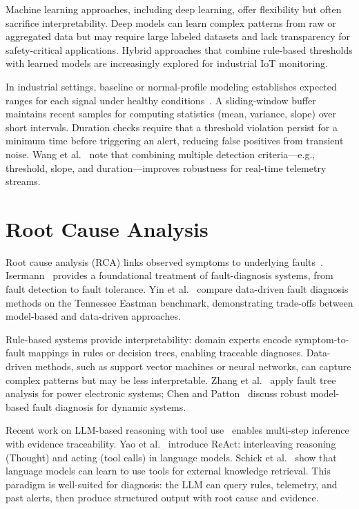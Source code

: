 \documentclass[12pt,letterpaper]{report}
\begin{document}
Machine learning approaches, including deep learning, offer flexibility but often sacrifice interpretability. Deep models can learn complex patterns from raw or aggregated data but may require large labeled datasets and lack transparency for safety-critical applications. Hybrid approaches that combine rule-based thresholds with learned models are increasingly explored for industrial IoT monitoring.

In industrial settings, baseline or normal-profile modeling establishes expected ranges for each signal under healthy conditions~\cite{li2021intelligent}. A sliding-window buffer maintains recent samples for computing statistics (mean, variance, slope) over short intervals. Duration checks require that a threshold violation persist for a minimum time before triggering an alert, reducing false positives from transient noise. Wang et al.~\cite{rahman2022deep} note that combining multiple detection criteria---e.g., threshold, slope, and duration---improves robustness for real-time telemetry streams.

\section{Root Cause Analysis}

Root cause analysis (RCA) links observed symptoms to underlying faults~\cite{isermann2006fault,yin2012comparison}. Isermann~\cite{isermann2006fault} provides a foundational treatment of fault-diagnosis systems, from fault detection to fault tolerance. Yin et al.~\cite{yin2012comparison} compare data-driven fault diagnosis methods on the Tennessee Eastman benchmark, demonstrating trade-offs between model-based and data-driven approaches.

Rule-based systems provide interpretability: domain experts encode symptom-to-fault mappings in rules or decision trees, enabling traceable diagnoses. Data-driven methods, such as support vector machines or neural networks, can capture complex patterns but may be less interpretable. Zhang et al.~\cite{zhang2009fault} apply fault tree analysis for power electronic systems; Chen and Patton~\cite{chen1999robust} discuss robust model-based fault diagnosis for dynamic systems.

Recent work on LLM-based reasoning with tool use~\cite{yao2023react,schick2023toolformer} enables multi-step inference with evidence traceability. Yao et al.~\cite{yao2023react} introduce ReAct: interleaving reasoning (Thought) and acting (tool calls) in language models. Schick et al.~\cite{schick2023toolformer} show that language models can learn to use tools for external knowledge retrieval. This paradigm is well-suited for diagnosis: the LLM can query rules, telemetry, and past alerts, then produce structured output with root cause and evidence.
\end{document}
